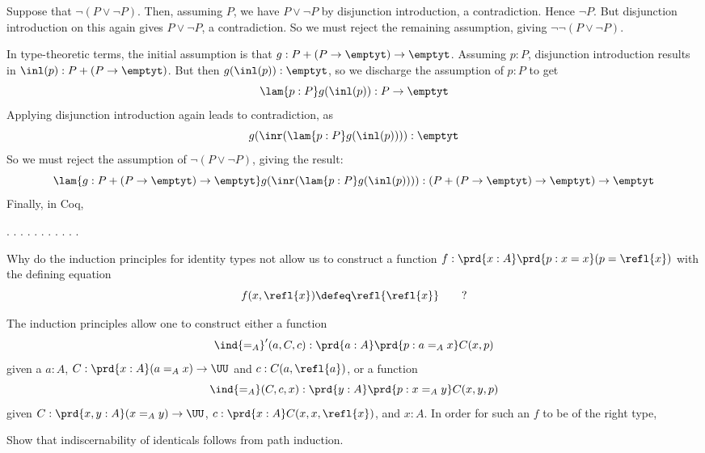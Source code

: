 \soln  
Suppose that $\lnot(P \lor \lnot P)$.  Then, assuming $P$, we have
$P \lor \lnot P$ by disjunction introduction, a contradiction.  Hence
$\lnot P$.  But disjunction introduction on this again gives $P \lor \lnot P$,
a contradiction.  So we must reject the remaining assumption, giving
$\lnot\lnot(P \lor \lnot P)$.


In type-theoretic terms, the initial assumption is that $g : P + (P \to
\emptyt) \to \emptyt$.  Assuming $p : P$, disjunction introduction results in
$\inl(p) : P + (P \to \emptyt)$.  But then $g(\inl(p)) : \emptyt$, so we
discharge the assumption of $p : P$ to get
\[
  \lam{p:P}g(\inl(p)) : P \to \emptyt
\]
Applying disjunction introduction again leads to contradiction, as
\[
  g(\inr(\lam{p:P}g(\inl(p)))) : \emptyt
\]
So we must reject the assumption of $\lnot( P \lor \lnot P)$, giving the
result:
\[
  \lam{g:P + (P \to \emptyt) \to \emptyt}g(\inr(\lam{p:P}g(\inl(p)))) 
  : 
  (P + (P \to \emptyt) \to \emptyt) \to \emptyt
\]
Finally, in Coq, \begin{coqdoccode}
\coqdocemptyline
\coqdocindent{1.00em}
 \coqdocnotation{\ensuremath{\lnot}} \coqdocnotation{\ensuremath{\lnot}} \coqdocnotation{(}  \coqdocnotation{\ensuremath{\lnot}}\coqdocnotation{)}.\coqdoceol
\coqdocindent{1.00em}
.\coqdoceol
\coqdocindent{2.00em}
 .\coqdoceol
\coqdocindent{2.00em}
 .\coqdoceol
\coqdocindent{2.00em}
 .\coqdoceol
\coqdocindent{2.00em}
.\coqdoceol
\coqdocindent{2.00em}
 .\coqdoceol
\coqdocindent{2.00em}
 .\coqdoceol
\coqdocindent{2.00em}
.\coqdoceol
\coqdocindent{2.00em}
 .\coqdoceol
\coqdocindent{1.00em}
.\coqdoceol
\coqdocemptyline
\coqdocemptyline
\end{coqdoccode}


Why do the induction principles for identity types not allow
us to construct a function $f : \prd{x:A}\prd{p:x=x}(p = \refl{x})$ with the
defining equation
\[
  f(x, \refl{x}) \defeq \refl{\refl{x}}\qquad?
\] 

 \soln
The induction principles allow one to construct either a function
\[
  \ind{=_{A}}'(a, C, c) : \prd{a:A}\prd{p:a=_{A}x} C(x, p)
\]
given a $a : A$, $C : \prd{x:A}(a =_{A} x) \to \UU$ and $c : C(a, \refl{a})$,
or a function
\[
  \ind{=_{A}}(C, c, x) : \prd{y : A}\prd{p : x =_{A} y} C(x, y, p)
\]
given $C : \prd{x, y:A} (x =_{A} y) \to \UU$, $c : \prd{x:A}C(x, x, \refl{x})$,
and $x:A$.  In order for such an $f$ to be of the right type,
\begin{coqdoccode}
\coqdocemptyline
\end{coqdoccode}
Show that indiscernability of identicals follows from path induction.

